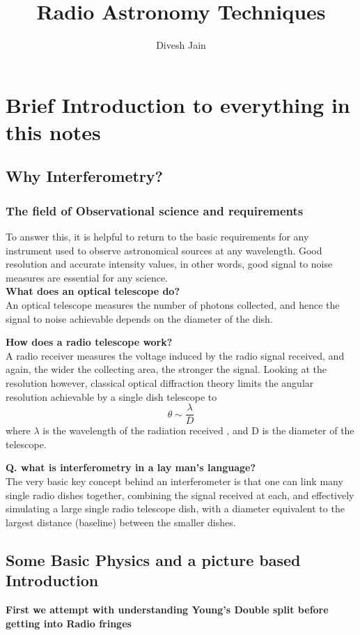 \documentclass[10pt]{report}
\newcommand{\tbf}[1]{\textbf{#1}}
\begin{document}
\title{Radio Astronomy Techniques}
\author{Divesh Jain}
\maketitle
\tableofcontents
\chapter{Brief Introduction to everything in this notes}
\section{Why Interferometry?}
\subsection{The field of Observational science and requirements}
To answer this, it is helpful to return to the basic requirements for any instrument used to observe astronomical sources at any wavelength. Good resolution and accurate intensity values, in other words, good signal to noise measures are essential for any science. \\

\tbf{What does an optical telescope do?}\\
An optical telescope measures the number of photons collected, and hence the signal to noise achievable depends on the diameter of the dish. 

\tbf{How does a radio telescope work?}\\
A radio receiver measures the voltage induced by the radio signal received, and again, the wider the collecting area, the stronger the signal. Looking at the resolution however, classical optical diffraction theory limits the angular resolution achievable by a single dish telescope to
\begin{equation}
\theta\sim \frac{\lambda}{D}
\end{equation}
where $\lambda$ is the wavelength of the radiation received , and D is the diameter of the telescope. 

\tbf{Q. what is interferometry in a lay man's language?}\\

The very basic key concept behind an interferometer is that one can link many single radio dishes together, combining the signal received at each, and effectively simulating a large single radio telescope dish, with a diameter equivalent to the largest distance (baseline) between the smaller dishes.
\section{Some Basic Physics and a picture based Introduction}
\tbf{First we attempt with understanding Young's Double split before getting into Radio fringes}\\
\end{document}
